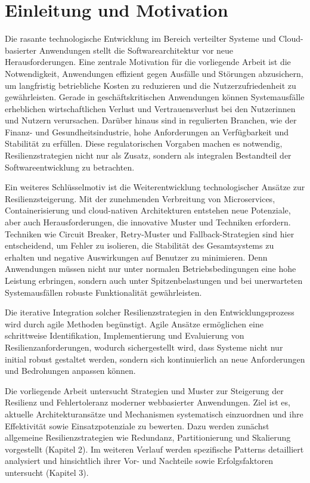 \section{Einleitung und Motivation}

Die rasante technologische Entwicklung im Bereich verteilter Systeme und Cloud-basierter Anwendungen stellt
die Softwarearchitektur vor neue Herausforderungen.
Eine zentrale Motivation für die vorliegende Arbeit ist die Notwendigkeit, Anwendungen effizient gegen
Ausfälle und Störungen abzusichern, um langfristig betriebliche Kosten zu reduzieren und die Nutzerzufriedenheit
zu gewährleisten.
Gerade in geschäftskritischen Anwendungen können Systemausfälle erheblichen wirtschaftlichen Verlust und
Vertrauensverlust bei den Nutzerinnen und Nutzern verursachen.
Darüber hinaus sind in regulierten Branchen, wie der Finanz- und Gesundheitsindustrie,
hohe Anforderungen an Verfügbarkeit und Stabilität zu erfüllen.
Diese regulatorischen Vorgaben machen es notwendig, Resilienzstrategien nicht nur als Zusatz,
sondern als integralen Bestandteil der Softwareentwicklung zu betrachten.

Ein weiteres Schlüsselmotiv ist die Weiterentwicklung technologischer Ansätze zur Resilienzsteigerung.
Mit der zunehmenden Verbreitung von Microservices, Containerisierung und cloud-nativen Architekturen
entstehen neue Potenziale, aber auch Herausforderungen, die innovative Muster und Techniken erfordern.
Techniken wie Circuit Breaker, Retry-Muster und Fallback-Strategien sind hier entscheidend, um Fehler zu isolieren,
die Stabilität des Gesamtsystems zu erhalten und negative Auswirkungen auf Benutzer zu minimieren.
Denn Anwendungen müssen nicht nur unter normalen Betriebsbedingungen eine hohe Leistung erbringen,
sondern auch unter Spitzenbelastungen und bei unerwarteten Systemausfällen robuste Funktionalität gewährleisten.


Die iterative Integration solcher Resilienzstrategien in den Entwicklungsprozess wird durch agile Methoden begünstigt.
Agile Ansätze ermöglichen eine schrittweise Identifikation, Implementierung und Evaluierung von Resilienzanforderungen,
wodurch sichergestellt wird, dass Systeme nicht nur initial robust gestaltet werden,
sondern sich kontinuierlich an neue Anforderungen und Bedrohungen anpassen können.


Die vorliegende Arbeit untersucht Strategien und Muster zur Steigerung der Resilienz
und Fehlertoleranz moderner webbasierter Anwendungen.
Ziel ist es, aktuelle Architekturansätze und Mechanismen systematisch einzuordnen und ihre Effektivität sowie
Einsatzpotenziale zu bewerten.
Dazu werden zunächst allgemeine Resilienzstrategien wie Redundanz, Partitionierung und Skalierung vorgestellt (Kapitel 2).
Im weiteren Verlauf werden spezifische Patterns detailliert analysiert
und hinsichtlich ihrer Vor- und Nachteile sowie Erfolgsfaktoren untersucht (Kapitel 3).


